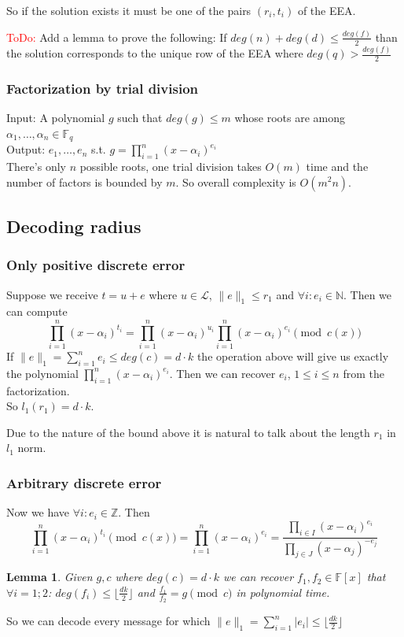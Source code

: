 \documentclass[12pt]{article}
\newcommand{\floor}[1]{\lfloor #1 \rfloor}
\newtheorem{lemma}{Lemma}
\begin{document}
So if the solution exists it must be one of the pairs $(r_i, t_i)$ of the EEA.

\textcolor{red}{ToDo:} Add a lemma to prove the following: If $deg(n) + deg(d) \leq \frac{deg(f)}{2}$ than the solution corresponds to the unique row of the EEA where $deg(q) > \frac{deg(f)}{2}$

\subsubsection{Factorization by trial division}
\label{subsubsec:factoring_polynomials}
Input: A polynomial $g$ such that $deg(g) \leq m$ whose roots are among $\alpha_1, \dots , \alpha_n \in \mathbb{F}_q$\\
Output: $e_1, \dots , e_n$ s.t. $g = \prod_{i = 1}^{n}(x - \alpha_i)^{e_i}$\\
There's only $n$ possible roots, one trial division takes $O(m)$ time and the number of factors is bounded by $m$. So overall complexity is $O(m^2n)$.


\subsection{Decoding radius}
\label{subsec:radius_polynomials}


\subsubsection{Only positive discrete error}
\label{subsubsec:positive_error}
Suppose we receive $t = u + e$ where $u \in \mathcal{L}$, $\|e\|_1 \leq r_1$ and $\forall i: e_i \in \mathbb{N}$. Then we can compute
\[
\prod_{i = 1}^{n}(x - \alpha_i)^{t_i} = \prod_{i = 1}^{n}(x - \alpha_i)^{u_i}\prod_{i = 1}^{n}(x - \alpha_i)^{e_i} \pmod{c(x)}
\]
If $\|e\|_1 = \sum_{i =1}^{n} e_i \leq deg(c) = d \cdot k$ the operation above will give us exactly the polynomial $\prod_{i = 1}^{n}(x - \alpha_i)^{e_i}$. Then we can recover $e_i$, $1 \leq i \leq n$ from the factorization.\\
So $l_1(r_1) = d \cdot k$.

Due to the nature of the bound above it is natural to talk about the length $r_1$ in $l_1$ norm.
\subsubsection{Arbitrary discrete error}
\label{subsubsec:discrete_error}
Now we have $\forall i: e_i \in \mathbb{Z}$. Then
\[
\prod_{i = 1}^{n}(x - \alpha_i)^{t_i} \pmod{c(x)} = \prod_{i = 1}^{n}(x - \alpha_i)^{e_i} = \frac{\prod_{i \in I}(x - \alpha_i)^{e_i}}{\prod_{j \in J}(x - \alpha_j)^{-e_j}}
\]
\begin{lemma}
Given $g,c$ where $deg(c) = d \cdot k$ we can recover $f_{1}, f_{2} \in \mathbb{F}[x]$ that  $\forall i = 1;2$: $deg(f_{i}) \leq \floor{\frac{dk}{2}}$ and $\frac{f_{1}}{f_{2}} = g \pmod{c}$ in polynomial time.
\end{lemma}
So we can decode every message for which $\|e\|_1 = \sum_{i =1}^{n} |e_i| \leq \floor{\frac{dk}{2}}$
\end{document}
